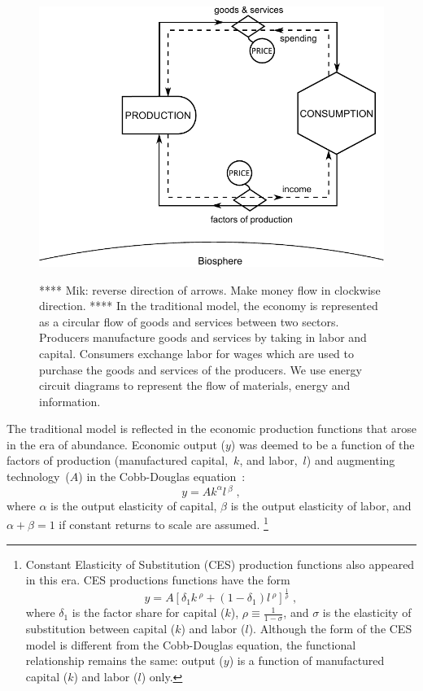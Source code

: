 \begin{figure}[!ht]
\centering\
\includegraphics[width=\linewidth]{Part_0/Chapter_Acct_For_WoN/images/Perpetual_motion_1.pdf}
\caption[The traditional model]{**** Mik: reverse direction of arrows. 
Make money flow in clockwise direction. ****
In the traditional model, the economy 
is represented as a circular flow of goods and services between two sectors. 
Producers manufacture goods and services 
by taking in labor and capital. 
Consumers exchange labor for wages 
which are used to purchase 
the goods and services of the producers.
We use energy circuit diagrams to represent the flow of 
materials, energy and information.\cite{Odum1996}}
\label{fig:perp_motion_1}
\end{figure}

The traditional model is reflected in the economic production functions
that arose in the era of abundance. 
Economic output ($y$) was deemed to be a function 
of the factors of production (manufactured capital,~$k$, and labor,~$l$)
and augmenting technology~($A$) in the Cobb-Douglas equation~\cite{Solow:1956wj}:
%
\begin{equation} \label{eq:cobb-douglas}
	y = A k^{\alpha} l \, ^\beta \; ,
\end{equation}	 
%
where $\alpha$ is the output elasticity of capital, $\beta$ is the output elasticity
of labor, and $\alpha + \beta = 1$ if constant returns to scale are assumed.%
	\footnote{
	Constant Elasticity of Substitution (CES) production functions also appeared 
	in this era.
	CES productions functions have the form
	\begin{equation*}
		y = A \left[ \delta_1 k \, ^\rho + (1-\delta_1) l \, ^\rho    \right]^{\frac{1}{\rho}} \; ,
	\end{equation*}
	where $\delta_1$ is the factor share for capital ($k$),
	$\rho \equiv \frac{1}{1-\sigma}$, and 
	$\sigma$ is the elasticity of substitution 
	between capital ($k$) and labor ($l$).\cite{Solow:1956wj}
	Although the form of the CES model is different from 
	the Cobb-Douglas equation, 
	the functional relationship remains the same: 
	output ($y$) is a function of manufactured capital ($k$) and labor ($l$) only.
	}

